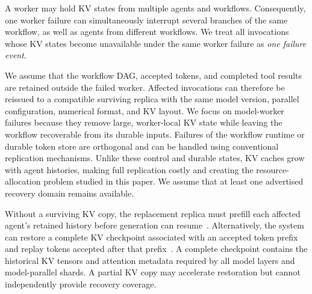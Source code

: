 A worker may hold KV states from multiple agents and workflows. Consequently, one worker failure can simultaneously interrupt several branches of the same workflow, as well as agents from different workflows. We treat all invocations whose KV states become unavailable under the same worker failure as \textit{one failure event}. 

We assume that the workflow DAG, accepted tokens, and completed tool results are retained outside the failed worker. Affected invocations can therefore be reissued to a compatible surviving replica with the same model version, parallel configuration, numerical format, and KV layout. We focus on model-worker failures because they remove large, worker-local KV state while leaving the workflow recoverable from its durable inputs. Failures of the workflow runtime or durable token store are orthogonal and can be handled using conventional replication mechanisms. Unlike these control and durable states, KV caches grow with agent histories, making full replication costly and creating the resource-allocation problem studied in this paper. We assume that at least one advertised recovery domain remains available. 

Without a surviving KV copy, the replacement replica must prefill each affected agent's retained history before generation can resume~\cite{strati2024dejavu}. Alternatively, the system can restore a complete KV checkpoint associated with an accepted token prefix and replay tokens accepted after that prefix~\cite{strati2024dejavu,cao2026lumen}. A complete checkpoint contains the historical KV tensors and attention metadata required by all model layers and model-parallel shards. A partial KV copy may accelerate restoration but cannot independently provide recovery coverage.
